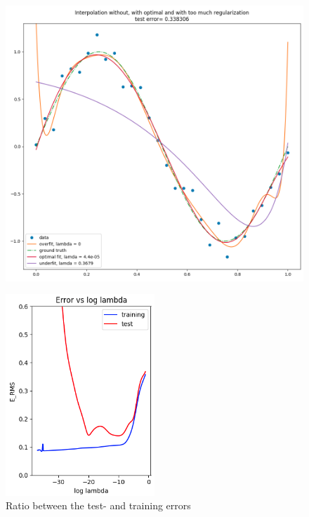 \documentclass{article}
\begin{document}
	\begin{figure}[h]
		\centering
		\includegraphics[width=\linewidth]{plots/full4cropped.png}
		\caption{}
		\label{plot:full4cropped}
	\end{figure}
	
	\begin{figure} %
		\centering
		\includegraphics[width=0.5\textwidth]{plots/error4cropped.png}
		\caption{Ratio between the test- and training errors}
		\label{plot:error4cropped}
	\end{figure}
	
\end{document}
